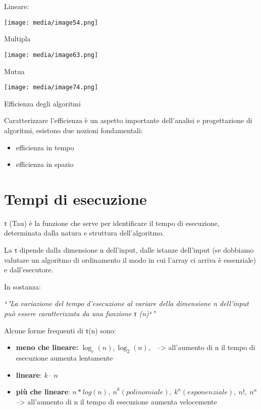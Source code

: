 Lineare:

\texttt{[image: media/image54.png]}

Multipla

\texttt{[image: media/image63.png]}

Mutua

\texttt{[image: media/image74.png]}

Efficienza degli algoritmi

Caratterizzare l'efficienza è un aspetto importante dell'analisi e
progettazione di algoritmi, esistono due nozioni fondamentali:

\begin{itemize}
\item
  efficienza in tempo
\item
  efficienza in spazio
\end{itemize}

\section{Tempi di esecuzione}\label{tempi-di-esecuzione}

τ (Tau) è la funzione che serve per identificare il tempo di esecuzione,
determinata dalla natura e struttura dell'algoritmo.

La τ dipende dalla dimensione n dell'input, dalle istanze dell'input (se
dobbiamo valutare un algoritmo di ordinamento il modo in cui l'array ci
arriva è essenziale) e dall'esecutore.

In sostanza:

\emph{\textbf{`\,'}La variazione del tempo d'esecuzione al variare della
dimensione n dell'input può essere caratterizzata da una funzione τ
(n)\textbf{`\,'}}

Alcune forme frequenti di τ(n) sono:

\begin{itemize}
\item
  \textbf{meno che lineare:} \(\log_{e}(n),\log_{2}(n),\ \ \)
  --\textgreater{} all'aumento di n il tempo di esecuzione aumenta
  lentamente
\item
  \textbf{lineare}: \(k \cdot \ n\)
\item
  \textbf{più che lineare}:
  \({n*log(n),\ n}^{k}(polinomiale),\ k^{n}(esponenziale),\ n!,\ n^{n}\)
  --\textgreater{} all'aumento di n il tempo di esecuzione aumenta
  velocemente
\end{itemize}

